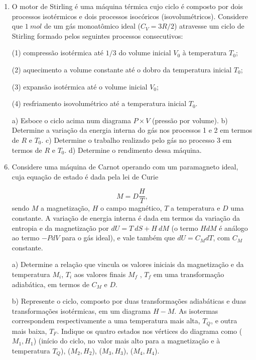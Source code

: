 \begin{enumerate}[start=1,label={\bfseries Q\arabic*.}]
\item O motor de Stirling é uma máquina térmica cujo ciclo é composto por dois processos isotérmicos e dois processos isocóricos (isovolumétricos). Considere que $1 \ mol$ de um gás monoatômico ideal ($C_{V} = 3R/2$) atravesse um ciclo de Stirling formado pelos seguintes processos consecutivos:


\item[(1)] compressão isotérmica até $1/3$ do volume inicial $V_{0}$ à temperatura $T_{0}$;
\item[(2)] aquecimento a volume constante até o dobro da temperatura inicial $T_{0}$;
\item[(3)] expansão isotérmica até o volume inicial $V_{0}$;
\item[(4)] resfriamento isovolumétrico até a temperatura inicial $T_{0}$.



a) Esboce o ciclo acima num diagrama $P \times V$ (pressão por volume).
b) Determine a variação da energia interna do gás nos processos 1 e 2 em termos de $R$ e $T_{0}$.
c) Determine o trabalho realizado pelo gás no processo 3 em termos de $R$ e $T_{0}$.
d) Determine o rendimento dessa máquina.




\item Considere uma máquina de Carnot operando com um paramagneto ideal, cuja equação de estado é dada pela lei de Curie

$$
M = D \frac{H}{T},
$$
sendo $M$ a magnetização, $H$ o campo magnético, $T$ a temperatura e $D$ uma constante. A variação de energia interna é dada em termos da variação da entropia e da magnetização por $dU = T \ dS + H \ dM$ (o termo $HdM$ é análogo ao termo $-PdV$ para o gás ideal), e vale também que $dU = C_{M}dT$, com $C_{M}$ constante.


a) Determine a relação que vincula os valores iniciais da magnetização e da temperatura $M_{i}$, $T_{i}$ aos valores finais $M_{f}$ , $T_{f}$ em uma transformação adiabática, em termos de $C_{M}$ e $D$.

b) Represente o ciclo, composto por duas transformações adiabáticas e duas transformações isotérmicas, em um diagrama $H-M$. As isotermas correspondem respectivamente a uma temperatura mais alta, $T_{Q}$, e outra mais baixa, $T_{F}$. Indique os quatro estados nos vértices do diagrama como ($M_{1},H_{1}$) (início do ciclo, no valor mais alto para a magnetização e à temperatura $T_{Q}$), ($M_{2},H_{2}$), ($M_{3},H_{3}$), ($M_{4},H_{4}$).


\end{enumerate}
